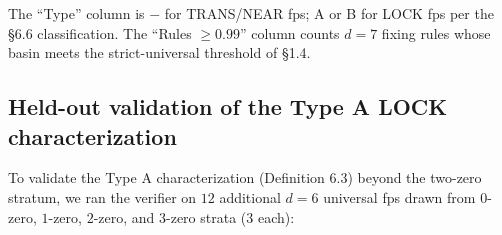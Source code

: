 \documentclass[11pt,letterpaper]{article}
\theoremstyle{paperstyle}
\theoremstyle{paperstyledef}
\theoremstyle{paperstylerem}
\begin{document}
The ``Type'' column is \(-\) for TRANS/NEAR fps; A or B for LOCK fps per
the §6.6 classification. The ``Rules \(\geq 0.99\)'' column counts
\(d = 7\) fixing rules whose basin meets the strict-universal threshold
of §1.4.

\hypertarget{d.3-held-out-validation-of-the-type-a-lock-characterization}{%
\subsection{Held-out validation of the Type A LOCK characterization}\label{d.3-held-out-validation-of-the-type-a-lock-characterization}}

To validate the Type A characterization (Definition 6.3) beyond the
two-zero stratum, we ran the verifier on \(12\) additional \(d = 6\)
universal fps drawn from \(0\)-zero, \(1\)-zero, \(2\)-zero, and
\(3\)-zero strata (\(3\) each):
\end{document}
